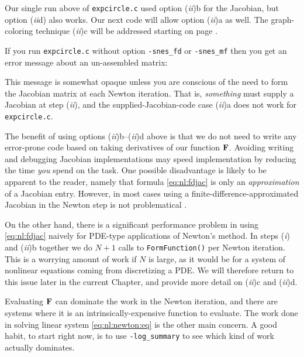 Our single run above of \texttt{expcircle.c} used option (\emph{ii})b for the Jacobian, but option (\emph{ii}d) also works.  Our next code will allow option (\emph{ii})a as well.  The graph-coloring technique (\emph{ii})c will be addressed starting on page \pageref{sec:nl:coloring}.

If you run \texttt{expcircle.c} without option \texttt{-snes\_fd} or \texttt{-snes\_mf} then you get an error message about an un-assembled matrix:
This message is somewhat opaque unless you are conscious of the need to form the Jacobian matrix at each Newton iteration.  That is, \emph{something} must supply a Jacobian at step (\emph{ii}), and the supplied-Jacobian-code case (\emph{ii})a does not work for \texttt{expcircle.c}.

The benefit of using options (\emph{ii})b--(\emph{ii})d above is that we do not need to write any error-prone code based on taking derivatives of our function $\mathbf{F}$.  Avoiding writing and debugging Jacobian implementations may speed implementation by reducing the time \emph{you} spend on the task.  One possible disadvantage is likely to be apparent to the reader, namely that formula \eqref{eq:nl:fdjac} is only an \emph{approximation} of a Jacobian entry.  However, in most cases using a finite-difference-approximated Jacobian in the Newton step is not problematical \citep{Kelley2003}.

On the other hand, there is a significant performance problem in using \eqref{eq:nl:fdjac} naively for PDE-type applications of Newton's method.  In steps (\emph{i}) and (\emph{ii})b together we do $N+1$ calls to \texttt{FormFunction()} per Newton iteration.  This is a worrying amount of work if $N$ is large, as it would be for a system of nonlinear equations coming from discretizing a PDE.  We will therefore return to this issue later in the current Chapter, and provide more detail on (\emph{ii})c and (\emph{ii})d.

Evaluating $\mathbf{F}$ can dominate the work in the Newton iteration, and there are systems where it is an intrinsically-expensive function to evaluate.  The work done in solving linear system \eqref{eq:nl:newton:eq} is the other main concern.  A good \PETSc habit, to start right now, is to use \texttt{-log\_summary} to see which kind of work actually dominates.


